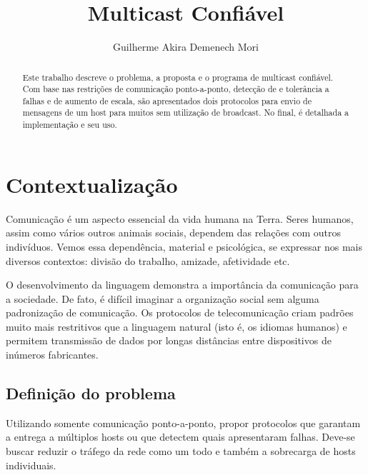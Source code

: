 \documentclass[12pt,twocolumn]{article}
\title{Multicast Confiável}
\author{Guilherme Akira Demenech Mori}
\begin{document}
	
	
	
		
		\maketitle	
	
		\begin{abstract}
			Este trabalho descreve o problema, a proposta e o programa de multicast confiável.
			Com base nas restrições de comunicação ponto-a-ponto, detecção de e tolerância a falhas e de aumento de escala, são apresentados dois protocolos para envio de mensagens de um host para muitos sem utilização de broadcast.
			No final, é detalhada a implementação e seu uso.
		\end{abstract}
	
		\tableofcontents
		
		\listoffigures
	

	
		\section*{Contextualização}
			Comunicação é um aspecto essencial da vida humana na Terra.
			Seres humanos, assim como vários outros animais sociais, dependem das relações com outros indivíduos.
			Vemos essa dependência, material e psicológica, se expressar nos mais diversos contextos: divisão do trabalho, amizade, afetividade etc.  
			
			O desenvolvimento da linguagem demonstra a importância da comunicação para a sociedade.
			De fato, é difícil imaginar a organização social sem alguma padronização de comunicação.
			Os protocolos de telecomunicação criam padrões muito mais restritivos que a linguagem natural (isto é, os idiomas humanos) e permitem transmissão de dados por longas distâncias entre dispositivos de inúmeros fabricantes.						  
	
			\subsection{Definição do problema}
				Utilizando somente comunicação ponto-a-ponto, propor protocolos que garantam a entrega a múltiplos hosts ou que detectem quais apresentaram falhas.  		
				Deve-se buscar reduzir o tráfego da rede como um todo e também a sobrecarga de hosts individuais.
				
\end{document}
